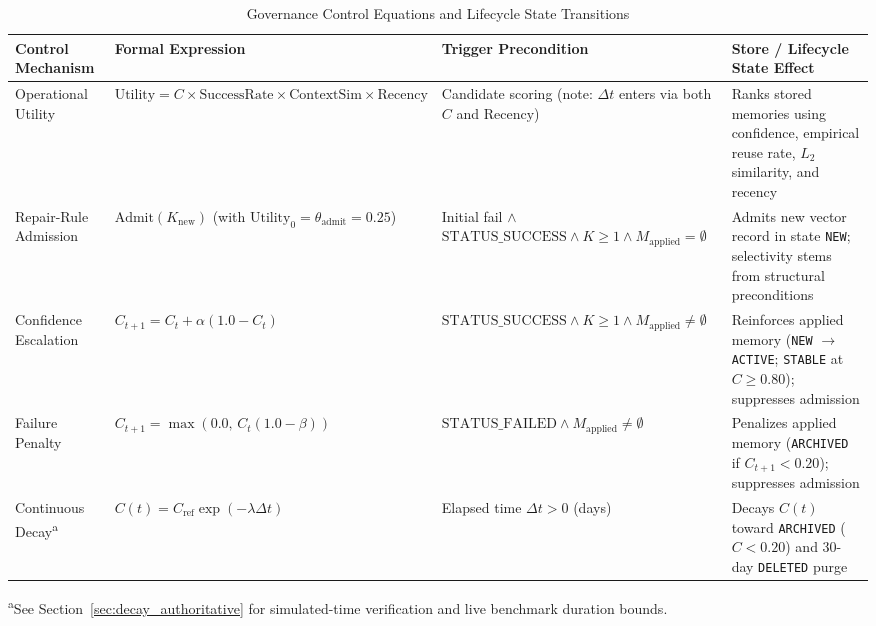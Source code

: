 \begin{table}[t]
\centering
\caption{Governance Control Equations and Lifecycle State Transitions}
\label{tab:governance_equations}
\footnotesize
\setlength{\tabcolsep}{4pt}
\renewcommand{\arraystretch}{1.05}
\begin{tabularx}{\textwidth}{@{}>{\raggedright\arraybackslash}p{2.7cm} >{\raggedright\arraybackslash}p{5.3cm} >{\raggedright\arraybackslash}p{3.7cm} >{\raggedright\arraybackslash}X@{}}
\toprule
\textbf{Control Mechanism} & \textbf{Formal Expression} & \textbf{Trigger Precondition} & \textbf{Store / Lifecycle State Effect} \\
\midrule
Operational Utility & $\text{Utility} = C \times \text{SuccessRate} \times \text{ContextSim} \times \text{Recency}$ & Candidate scoring (note: $\Delta t$ enters via both $C$ and $\text{Recency}$) & Ranks stored memories using confidence, empirical reuse rate, $L_2$ similarity, and recency \\
Repair-Rule Admission & $\text{Admit}(K_{\text{new}})$ (with $\text{Utility}_0 = \theta_{\text{admit}} = 0.25$) & Initial fail $\land$ $\text{STATUS\_SUCCESS} \land K \ge 1 \land M_{\text{applied}} = \emptyset$ & Admits new vector record in state \texttt{NEW}; selectivity stems from structural preconditions \\
Confidence Escalation & $C_{t+1} = C_t + \alpha (1.0 - C_t)$ & $\text{STATUS\_SUCCESS} \land K \ge 1 \land M_{\text{applied}} \neq \emptyset$ & Reinforces applied memory (\texttt{NEW} $\to$ \texttt{ACTIVE}; \texttt{STABLE} at $C \ge 0.80$); suppresses admission \\
Failure Penalty & $C_{t+1} = \max(0.0, \, C_t (1.0 - \beta))$ & $\text{STATUS\_FAILED} \land M_{\text{applied}} \neq \emptyset$ & Penalizes applied memory (\texttt{ARCHIVED} if $C_{t+1} < 0.20$); suppresses admission \\
Continuous Decay\textsuperscript{a} & $C(t) = C_{\text{ref}} \exp(-\lambda \Delta t)$ & Elapsed time $\Delta t > 0$ (days) & Decays $C(t)$ toward \texttt{ARCHIVED} ($C < 0.20$) and 30-day \texttt{DELETED} purge \\
\bottomrule
\end{tabularx}
\vspace{2.0pt}
\begin{minipage}{\textwidth}
\footnotesize \textsuperscript{a}See Section~\ref{sec:decay_authoritative} for simulated-time verification and live benchmark duration bounds.
\end{minipage}
\end{table}

